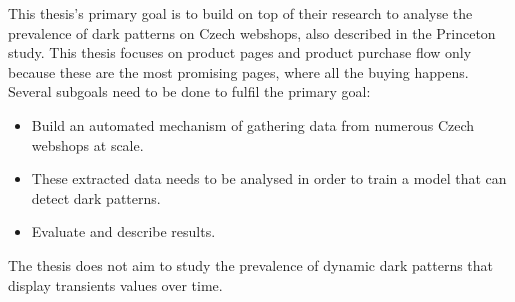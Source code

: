 
This thesis's primary goal is to build on top of their research to analyse the prevalence of dark patterns on Czech webshops, also described in the Princeton study\cite{dark-patterns-at-scale}. This thesis focuses on product pages and product purchase flow only because these are the most promising pages, where all the buying happens. Several subgoals need to be done to fulfil the primary goal:
\begin{itemize}
    \item Build an automated mechanism of gathering data from numerous Czech webshops at scale.
    \item These extracted data needs to be analysed in order to train a model that can detect dark patterns.
    \item Evaluate and describe results.
\end{itemize}

The thesis does not aim to study the prevalence of dynamic dark patterns that display transients values over time.